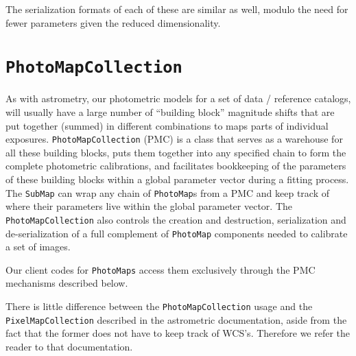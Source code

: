 \documentclass[11pt,preprint,flushrt]{aastex}
\begin{document}
The serialization formats of each of these are similar as well, modulo the need for fewer parameters given the reduced dimensionality.

\section{\texttt{PhotoMapCollection}}
\label{pmc}
As with astrometry, our photometric models for a set of data / reference catalogs, will usually have a large number of ``building block'' magnitude shifts that are put together (summed) in different combinations to maps parts of individual exposures.  {\tt PhotoMapCollection} (PMC) is a class that serves as a warehouse for all these building blocks, puts them together into any specified chain to form the complete photometric calibrations, and facilitates bookkeeping of the parameters of these building blocks within a global parameter vector during a fitting process.  The {\tt SubMap} can wrap any chain of {\tt PhotoMap}s from a PMC and keep track of where their parameters live within the global parameter vector.  The {\tt PhotoMapCollection} also controls the creation and destruction, serialization and de-serialization of a full complement of {\tt PhotoMap} components needed to calibrate a set of images.

Our client codes for \texttt{PhotoMaps} access them exclusively through the PMC mechanisms described below. 

There is little difference between the \texttt{PhotoMapCollection} usage and the \texttt{PixelMapCollection} described in the astrometric documentation, aside from the fact that the former does not have to keep track of WCS's.  Therefore we refer the reader to that documentation.
\end{document}
